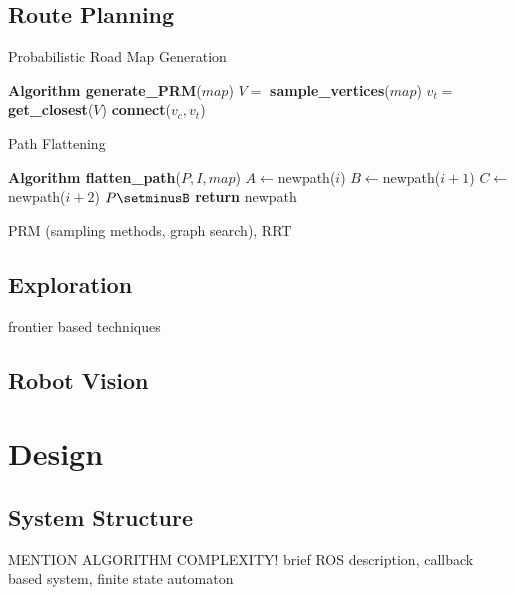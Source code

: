 \documentclass[conference]{IEEEtran}
\begin{document}
\subsection{Route Planning}
\begin{algorithm}
  \caption{Probabilistic Road Map Generation}
  \label{alg:prm}
  \begin{algorithmic}[1]
    \State \textbf{Algorithm generate\_PRM}\textnormal{($map$)}
    \State $V = $\textbf{ sample\_vertices}\textnormal{($map$)}
    \State $v_t =$\textbf{ get\_closest}\textnormal{($V$)}
    \State \textbf{connect}\textnormal{($v_c, v_t$)}
    \EndIf
    \Else
    \EndIf
    \EndWhile
    \EndFor
  \end{algorithmic}
\end{algorithm}
\begin{algorithm}
  \caption{Path Flattening}
  \label{alg:pathflat}
  \begin{algorithmic}[1]
    \State \textbf{Algorithm flatten\_path}\textnormal{($P, I, map$)}
    \State $A \gets $\textnormal{newpath($i$)}
    \State $B \gets $\textnormal{newpath($i+1$)}
    \State $C \gets $\textnormal{newpath($i+2$)}
    \State $P\setminusB$
    \EndIf
    \EndFor
    \EndFor
    \State \textbf{return}\textnormal{ newpath}
  \end{algorithmic}
\end{algorithm}
PRM (sampling methods, graph search), RRT
\subsection{Exploration}
frontier based techniques
\subsection{Robot Vision}
\section{Design}
\subsection{System Structure}
MENTION ALGORITHM COMPLEXITY!
brief ROS description, callback based system, finite state automaton
\end{document}
